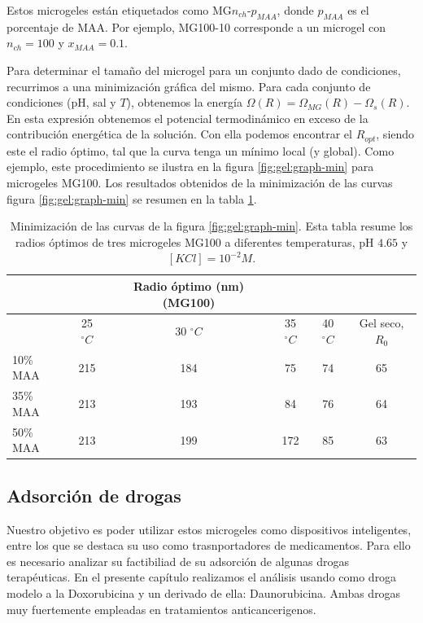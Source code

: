 Estos microgeles est\'an etiquetados como MG$n_{ch}$-$p_{MAA}$, donde $p_{MAA}$ es el porcentaje de MAA.
Por ejemplo, MG100-10 corresponde a un  microgel con $n_{ch}=100$ y $x_{MAA}=0.1$.


Para determinar el tama\~no del microgel para un conjunto dado de condiciones, recurrimos a una minimizaci\'on gr\'afica del mismo.
Para cada conjunto de condiciones (pH, sal y $T$), obtenemos la energ\'ia $\Omega(R)=\Omega_{MG}(R)-\Omega_{s}(R)$. En esta expresi\'on obtenemos el potencial termodin\'amico en exceso de la contribuci\'on energ\'etica de la soluci\'on.
Con ella podemos encontrar el $R_{opt }$, siendo este el radio \'optimo, tal que la curva tenga un m\'inimo local (y global).
Como ejemplo, este procedimiento se ilustra en la figura \ref{fig:gel:graph-min} para microgeles MG100.
Los resultados obtenidos de la minimizaci\'on de las curvas figura \ref{fig:gel:graph-min} se resumen en la tabla \ref{table:gel:optimal-R}.

\begin{table}[!htb]
\centering
\small
  \begin{tabular}{|lccccc|}
   \hline %
    	&&   Radio \'optimo (nm)(MG100) & && \\
    	\hline
      & {25 $^\circ C$} & {30 $^\circ C$} & {35 $^\circ C$} & {40 $^\circ C$} & {Gel seco, $R_0$} \\
      \hline
    10\% MAA & 215 &  184 &  75  &  74 & 65\\
    35\% MAA &  213 &  193 &  84 & 76 & 64\\
    50\% MAA &  213 & 199 &  172 & 85 & 63\\
    \hline
  \end{tabular}
 \caption{Minimizaci\'on de las curvas de la  figura \ref{fig:gel:graph-min}.
 	Esta tabla resume los radios \'optimos de tres microgeles MG100 a diferentes temperaturas, pH $4.65$ y $[KCl]=10^{-2}M$.}
\label{table:gel:optimal-R} 
\end{table}


\subsection{Adsorci\'on de drogas}\label{sec:gel:adsorcion}

Nuestro objetivo es poder utilizar estos microgeles como dispositivos inteligentes, entre los que se destaca su uso como trasnportadores de medicamentos. Para ello es necesario analizar su factibiliad de su adsorci\'on de algunas drogas terap\'euticas. En el presente cap\'itulo realizamos el an\'alisis usando como droga modelo a la Doxorubicina y un derivado de ella: Daunorubicina. Ambas drogas muy fuertemente empleadas en tratamientos anticancerigenos. 

